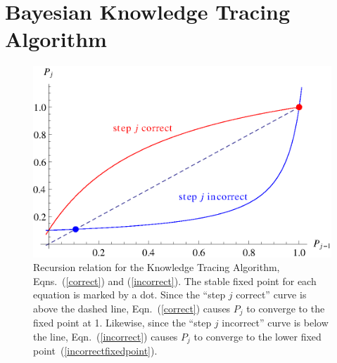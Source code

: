 \documentclass{acmlarge-edm}
\begin{document}
\section{Bayesian Knowledge Tracing Algorithm}

\begin{figure}
\centering\includegraphics{p-recursion.eps}
\caption{
  Recursion relation for the Knowledge Tracing Algorithm, 
  Eqns.~(\ref{correct}) and (\ref{incorrect}).
  The stable fixed point for each equation is marked
  by a dot.  Since the ``step $j$ correct'' curve is above the
  dashed line, Eqn.~(\ref{correct}) causes $P_j$ to converge to the fixed point at 1.  Likewise, since 
   the ``step $j$ incorrect'' curve is below the line, 
   Eqn.~(\ref{incorrect}) causes $P_j$ to converge to the lower fixed point~(\ref{incorrectfixedpoint}).
 }
 \label{p-recursion}
\end{figure}
\end{document}
